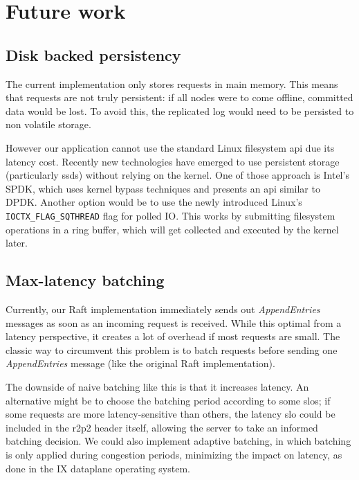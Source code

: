 \chapter{Future work}

\section{Disk backed persistency}

The current implementation only stores requests in main memory.
This means that requests are not truly persistent: if all nodes were to come offline, committed data would be lost.
To avoid this, the replicated log would need to be persisted to non volatile storage.

However our application cannot use the standard Linux filesystem \gls{api} due its latency cost.
Recently new technologies have emerged to use persistent storage (particularly \glspl{ssd}) without relying on the kernel.
One of those approach is Intel's SPDK\cite{spdk}, which uses kernel bypass techniques and presents an \gls{api} similar to DPDK.
Another option would be to use the newly introduced Linux's \texttt{IOCTX\_FLAG\_SQTHREAD} flag for polled IO\cite{ioctx_flag_sqthread}.
This works by submitting filesystem operations in a ring buffer, which will get collected and executed by the kernel later.

\section{Max-latency batching}

Currently, our Raft implementation immediately sends out \emph{AppendEntries} messages as soon as an incoming request is received.
While this optimal from a latency perspective, it creates a lot of overhead if most requests are small.
The classic way to circumvent this problem is to batch requests before sending one \emph{AppendEntries} message (\ie like the original Raft implementation\cite{raft}).

The downside of naive batching like this is that it increases latency.
An alternative might be to choose the batching period according to some \glspl{slo};
if some requests are more latency-sensitive than others, the latency \gls{slo} could be included in the \gls{r2p2} header itself, allowing the server to take an informed batching decision.
We could also implement adaptive batching, in which batching is only applied during congestion periods, minimizing the impact on latency, as done in the IX dataplane operating system\cite{ix}.


